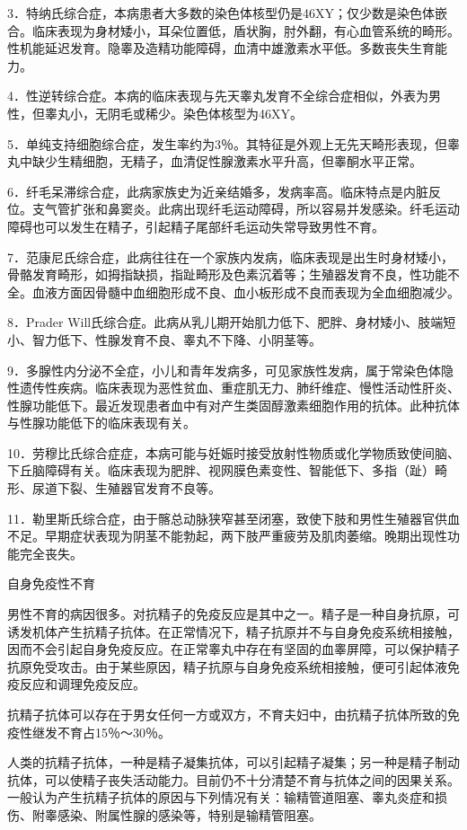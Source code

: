 \documentclass[12pt,UTF8]{ctexbook}
\begin{document}
3．特纳氏综合症，本病患者大多数的染色体核型仍是46XY；仅少数是染色体嵌合。临床表现为身材矮小，耳朵位置低，盾状胸，肘外翻，有心血管系统的畸形。性机能延迟发育。隐睾及造精功能障碍，血清中雄激素水平低。多数丧失生育能力。

4．性逆转综合症。本病的临床表现与先天睾丸发育不全综合症相似，外表为男性，但睾丸小，无阴毛或稀少。染色体核型为46XY。

5．单纯支持细胞综合症，发生率约为3％。其特征是外观上无先天畸形表现，但睾丸中缺少生精细胞，无精子，血清促性腺激素水平升高，但睾酮水平正常。

6．纤毛呆滞综合症，此病家族史为近亲结婚多，发病率高。临床特点是内脏反位。支气管扩张和鼻窦炎。此病出现纤毛运动障碍，所以容易并发感染。纤毛运动障碍也可以发生在精子，引起精子尾部纤毛运动失常导致男性不育。

7．范康尼氏综合症，此病往往在一个家族内发病，临床表现是出生时身材矮小，骨骼发育畸形，如拇指缺损，指趾畸形及色素沉着等；生殖器发育不良，性功能不全。血液方面因骨髓中血细胞形成不良、血小板形成不良而表现为全血细胞减少。

8．Prader Will氏综合症。此病从乳儿期开始肌力低下、肥胖、身材矮小、肢端短小、智力低下、性腺发育不良、睾丸不下降、小阴茎等。

9．多腺性内分泌不全症，小儿和青年发病多，可见家族性发病，属于常染色体隐性遗传性疾病。临床表现为恶性贫血、重症肌无力、肺纤维症、慢性活动性肝炎、性腺功能低下。最近发现患者血中有对产生类固醇激素细胞作用的抗体。此种抗体与性腺功能低下的临床表现有关。

10．劳穆比氏综合症症，本病可能与妊娠时接受放射性物质或化学物质致使间脑、下丘脑障碍有关。临床表现为肥胖、视网膜色素变性、智能低下、多指（趾）畸形、尿道下裂、生殖器官发育不良等。

11．勒里斯氏综合症，由于髂总动脉狭窄甚至闭塞，致使下肢和男性生殖器官供血不足。早期症状表现为阴茎不能勃起，两下肢严重疲劳及肌肉萎缩。晚期出现性功能完全丧失。





自身免疫性不育


男性不育的病因很多。对抗精子的免疫反应是其中之一。精子是一种自身抗原，可诱发机体产生抗精子抗体。在正常情况下，精子抗原并不与自身免疫系统相接触，因而不会引起自身免疫反应。在正常睾丸中存在有坚固的血睾屏障，可以保护精子抗原免受攻击。由于某些原因，精子抗原与自身免疫系统相接触，便可引起体液免疫反应和调理免疫反应。

抗精子抗体可以存在于男女任何一方或双方，不育夫妇中，由抗精子抗体所致的免疫性继发不育占15％～30％。

人类的抗精子抗体，一种是精子凝集抗体，可以引起精子凝集；另一种是精子制动抗体，可以使精子丧失活动能力。目前仍不十分清楚不育与抗体之间的因果关系。一般认为产生抗精子抗体的原因与下列情况有关：输精管道阻塞、睾丸炎症和损伤、附睾感染、附属性腺的感染等，特别是输精管阻塞。
\end{document}
